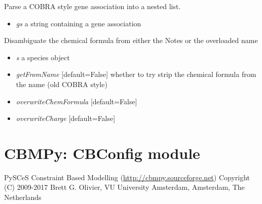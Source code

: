 \documentclass[a4paper,11pt,english]{sphinxmanual}
\begin{document}

\begin{fulllineitems}
\label{modules_doc:cbmpy.CBCommon.parseGeneAssociation}
Parse a COBRA style gene association into a nested list.
\begin{itemize}
\item {} 
\emph{gs} a string containing a gene association

\end{itemize}

\end{fulllineitems}


\begin{fulllineitems}
\label{modules_doc:cbmpy.CBCommon.processSpeciesChargeChemFormulaAnnot}
Disambiguate the chemical formula from either the Notes or the overloaded name
\begin{itemize}
\item {} 
\emph{s} a species object

\item {} 
\emph{getFromName} {[}default=False{]} whether to try strip the chemical formula from the name (old COBRA style)

\item {} 
\emph{overwriteChemFormula} {[}default=False{]}

\item {} 
\emph{overwriteCharge} {[}default=False{]}

\end{itemize}

\end{fulllineitems}

\label{modules_doc:module-cbmpy.CBConfig}

\section{CBMPy: CBConfig module}
\label{modules_doc:cbmpy-cbconfig-module}
PySCeS Constraint Based Modelling (\url{http://cbmpy.sourceforge.net})
Copyright (C) 2009-2017 Brett G. Olivier, VU University Amsterdam, Amsterdam, The Netherlands
\end{document}
